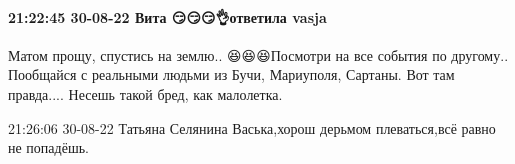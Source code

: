  
 
 
 
 

\paragraph{21:22:45 30-08-22 Вита 😏😏😏👌ответила vasja}

Матом прощу, спустись на землю.. 😆😆😆Посмотри на все события по другому..
Пообщайся с реальными людьми из Бучи, Мариуполя, Сартаны. Вот там правда....
Несешь такой бред, как малолетка.

21:26:06 30-08-22
Татьяна Селянина
Васька,хорош дерьмом плеваться,всё равно не попадёшь.🤣🤣🤣
